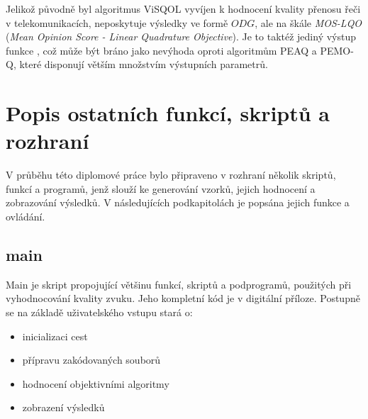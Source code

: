 Jelikož původně byl algoritmus ViSQOL vyvíjen k hodnocení kvality přenosu řeči v telekomunikacích, neposkytuje výsledky ve formě $ODG$, ale na škále \textit{MOS-LQO} (\textit{Mean Opinion Score - Linear Quadrature Objective}). Je to taktéž jediný výstup funkce , což může být bráno jako nevýhoda oproti algoritmům PEAQ a PEMO-Q, které disponují větším množstvím výstupních parametrů.

\section{Popis ostatních funkcí, skriptů a rozhraní}

V průběhu této diplomové práce bylo připraveno v rozhraní \matlab několik skriptů, funkcí a programů, jenž slouží ke generování vzorků, jejich hodnocení a zobrazování výsledků. V následujících podkapitolách je popsána jejich funkce a ovládání.

\subsection{main}

Main je skript propojující většinu funkcí, skriptů a podprogramů, použitých při vyhodnocování kvality zvuku. Jeho kompletní kód je v digitální příloze.%
Postupně se na základě uživatelského vstupu stará o:
\begin{itemize}
    \item inicializaci cest
    \item přípravu zakódovaných souborů
    \item hodnocení objektivními algoritmy
    \item zobrazení výsledků
\end{itemize}

